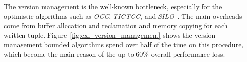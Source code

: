 The version management is the well-known bottleneck, especially for the optimistic algorithms such as \textit{OCC}, \textit{TICTOC}, and \textit{SILO}~\cite{full-story, abyss, deneva}. The main overheads come from buffer allocation and reclamation and memory copying for each written tuple. Figure~\ref{fig:cxl_version_management} shows the version management bounded algorithms spend over half of the time on this procedure, which become the main reason of the up to 60\% overall performance loss. 

\fi









\ifx\stale\undefined

